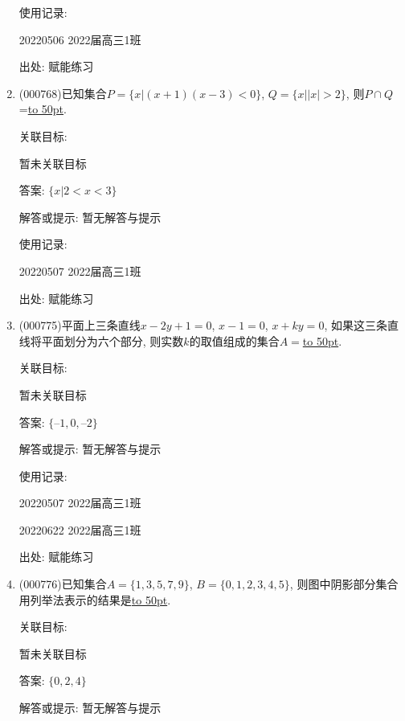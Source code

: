 \documentclass[10pt,a4paper]{article}
\newcommand{\blank}[1]{\underline{\hbox to #1pt{}}}
\begin{document}
\begin{enumerate}[1.]
使用记录:

20220506	2022届高三1班	


出处: 赋能练习
\item { (000768)}已知集合$P=\{x|(x+1)(x-3)<0\}$, $Q=\{x||x|>2\}$, 则$P\cap Q$=\blank{50}.


关联目标:

暂未关联目标

答案: $\{x|2<x<3\}$

解答或提示: 暂无解答与提示

使用记录:

20220507	2022届高三1班	


出处: 赋能练习
\item { (000775)}平面上三条直线$x-2y+1=0$, $x-1=0$, $x+ky=0$, 如果这三条直线将平面划分为六个部分, 则实数$k$的取值组成的集合$A=$\blank{50}.


关联目标:

暂未关联目标

答案: $\{–1, 0, –2\}$

解答或提示: 暂无解答与提示

使用记录:

20220507	2022届高三1班	

20220622	2022届高三1班  	


出处: 赋能练习
\item { (000776)}已知集合$A=\{1,3,5,7,9\}$, $B=\{0,1,2,3,4,5\}$, 则图中阴影部分集合用列举法表示的结果是\blank{50}.
\begin{center}
\end{center}


关联目标:

暂未关联目标

答案: $\{0, 2, 4\}$

解答或提示: 暂无解答与提示


\end{enumerate}
\end{document}
